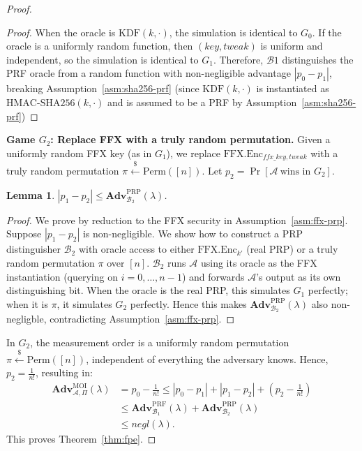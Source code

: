 \documentclass[journal]{IEEEtran}
\newtheorem{lemma}{Lemma}[section]
\newcommand{\Adv}{\mathbf{Adv}}
\begin{document}
\begin{proof}
\begin{proof}
When the oracle is $\mathrm{KDF}(k,\cdot)$, the simulation is identical to $G_0$.
If the oracle is a uniformly random function, then
$(\mathit{key},\mathit{tweak})$ is uniform and independent, so the simulation is
identical to $G_1$.
Therefore, $\mathcal{B}1$ distinguishes the PRF oracle from a random function
with non-negligible advantage $|p_0-p_1|$, breaking Assumption~\ref{asm:sha256-prf} (since $\mathrm{KDF}(k,\cdot)$ is instantiated as
$\mathrm{HMAC\text{-}SHA256}(k,\cdot)$ and is assumed to be a PRF by
Assumption~\ref{asm:sha256-prf})
\end{proof}

 
\medskip
\noindent\textbf{Game $G_2$: Replace FFX with a truly random permutation.}
Given a uniformly random FFX key (as in $G_1$), we replace
$\mathrm{FFX.Enc}_{\mathit{ffx\_key},\mathit{tweak}}$ with a truly random
permutation $\pi \xleftarrow{\$} \mathrm{Perm}([n])$.
Let $p_2 = \Pr[\mathcal{A}\ \text{wins in }G_2]$.
 
\begin{lemma}
\label{lem:fpe-g1-g2}
$|p_1 - p_2| \leq \Adv^{\mathrm{PRP}}_{\mathcal{B}_2}(\lambda)$.
\end{lemma}
\begin{proof}
We prove by reduction to the FFX security in Assumption~\ref{asm:ffx-prp}.
Suppose $|p_1 - p_2|$ is non-negligible.
We show how to construct a PRP distinguisher $\mathcal{B}_2$ with oracle access to
either $\mathrm{FFX.Enc}_{k'}$ (real PRP) or a truly random
permutation $\pi$ over $[n]$.
$\mathcal{B}_2$ runs $\mathcal{A}$ using its oracle as the FFX instantiation
(querying on $i = 0,\dots,n-1$) and forwards $\mathcal{A}$'s output as
its own distinguishing bit.
When the oracle is the real PRP, this simulates $G_1$ perfectly;
when it is $\pi$, it simulates $G_2$ perfectly.
Hence this makes $\Adv^{\mathrm{PRP}}_{\mathcal{B}_2}(\lambda)$ also non-negligble,
contradicting Assumption~\ref{asm:ffx-prp}.
\end{proof}
 
In $G_2$, the measurement order is a uniformly random permutation
$\pi \xleftarrow{\$} \mathrm{Perm}([n])$, independent of everything the
adversary knows.
Hence, $p_2 = \frac{1}{n!}$, resulting in:
\[
\begin{aligned}
  \Adv^{\mathrm{MOI}}_{\mathcal{A},\Pi}(\lambda)
  &= p_0 - \tfrac{1}{n!}
  \leq |p_0 - p_1| + |p_1 - p_2| + (p_2 - \tfrac{1}{n!})\\
  &\leq \Adv^{\mathrm{PRF}}_{\mathcal{B}_1}(\lambda)
       + \Adv^{\mathrm{PRP}}_{\mathcal{B}_2}(\lambda)\\
  &\leq \mathit{negl}(\lambda).
\end{aligned}
\]
This proves Theorem~\ref{thm:fpe}.

\end{proof}
\end{document}
